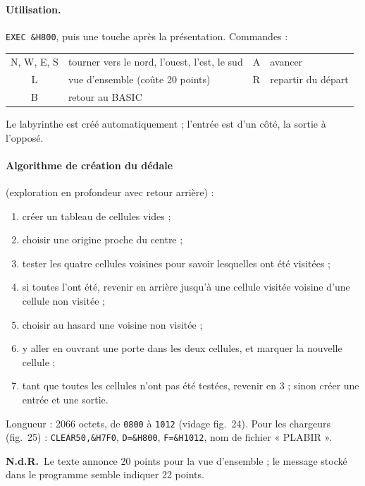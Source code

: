 \documentclass[a4paper,10pt]{article}
\newcommand{\hex}[1]{\texttt{#1}}
\newcommand{\nota}[1]{\textcolor{red!60!black}{\small\textbf{N.d.R.}~#1}}
\begin{document}
\paragraph{Utilisation.} \texttt{EXEC \&H800}, puis une touche après la
présentation. Commandes :
\begin{center}\small
\begin{tabular}{@{}cl|cl@{}}
\toprule
N, W, E, S & tourner vers le nord, l'ouest, l'est, le sud & A & avancer \\
L & vue d'ensemble (coûte 20 points) & R & repartir du départ \\
B & retour au BASIC & & \\
\bottomrule
\end{tabular}
\end{center}
Le labyrinthe est créé automatiquement ; l'entrée est d'un côté, la sortie
à l'opposé.

\paragraph{Algorithme de création du dédale} (exploration en profondeur avec
retour arrière) :
\begin{enumerate}
  \item créer un tableau de cellules vides ;
  \item choisir une origine proche du centre ;
  \item tester les quatre cellules voisines pour savoir lesquelles ont été
        visitées ;
  \item si toutes l'ont été, revenir en arrière jusqu'à une cellule visitée
        voisine d'une cellule non visitée ;
  \item choisir au hasard une voisine non visitée ;
  \item y aller en ouvrant une porte dans les deux cellules, et marquer la
        nouvelle cellule ;
  \item tant que toutes les cellules n'ont pas été testées, revenir en 3 ;
        sinon créer une entrée et une sortie.
\end{enumerate}
Longueur : 2066 octets, de \hex{0800} à \hex{1012} (vidage fig.~24). Pour
les chargeurs (fig.~25) : \texttt{CLEAR50,\&H7F0}, \texttt{D=\&H800},
\texttt{F=\&H1012}, nom de fichier « PLABIR ».

\nota{Le texte annonce 20 points pour la vue d'ensemble ; le message stocké
dans le programme semble indiquer 22 points.}

\end{document}
